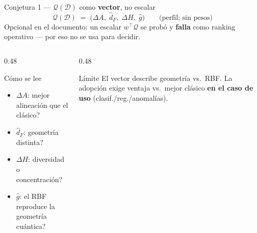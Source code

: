 \documentclass[aspectratio=169,10pt,professionalfonts]{beamer}
\begin{document}
\begin{frame}{Conjetura 1 --- $\mathcal{Q}(\mathcal{D})$ como \textbf{vector}, no escalar}
\begin{equation}
  \mathcal{Q}(\mathcal{D})
  \;=\;
  \bigl(\Delta A,\; \hat{d}_F,\; \Delta H,\; \hat g\bigr)
  \qquad\text{(perfil; sin pesos)}
  \label{eq:Q}
\end{equation}
{\footnotesize
Opcional en el documento: un escalar $w^\top\mathcal{Q}$ se probó y \textbf{falla} como ranking
operativo --- por eso no se usa para decidir.}

\vspace{0.4em}
\begin{columns}[T]
\begin{column}{0.48\textwidth}
\begin{block}{Cómo se lee}
{\footnotesize
\begin{itemize}
  \item $\Delta A$: \textquestiondown{}mejor alineación
        que el clásico?
  \item $\hat{d}_F$: \textquestiondown{}geometría distinta?
  \item $\Delta H$: \textquestiondown{}diversidad o
        concentración?
  \item $\hat g$: \textquestiondown{}el RBF reproduce
        la geometr\'ia cu\'antica?
\end{itemize}}
\end{block}
\end{column}
\begin{column}{0.48\textwidth}
\begin{alertblock}{Límite}
{\footnotesize
El vector describe geometría vs.\ RBF.
La adopción exige ventaja vs.\
mejor clásico \textbf{en el caso de uso}
(clasif./reg./anomalías).}
\end{alertblock}
\end{column}
\end{columns}
\end{frame}
\end{document}
